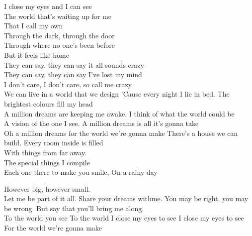 \ve{}
I close my eyes and I can see\\
The world that's waiting up for me\\
That I call my own\\
Through the dark, through the door\\
Through where no one's been before\\
But it feels like home\\
They can say, they can say it all sounds crazy\\
They can say, they can say I've lost my mind\\
I don't care, I don't care, so call me crazy\\
We can live in a world that we design
\cho{}
'Cause every night I lie in bed.
The brightest colours fill my head\\
A million dreams are keeping me awake.
I think of what the world could be\\
A vision of the one I see.
A million dreams is all it's gonna take\\
Oh a million dreams for the world we're gonna make
\ve{}
There's a house we can build.
Every room inside is filled\\
With things from far away.\\
The special things I compile\\
Each one there to make you smile,
On a rainy day

\cho{}

\ve{}
However big, however small.\\
Let me be part of it all.
Share your dreams withme.
You may be right, you may be wrong.
But say that you'll bring me along.\\
To the world you see
To the world I close my eyes to see
I close my eyes to see
\cho{}
For the world we're gonna make
\esong{}